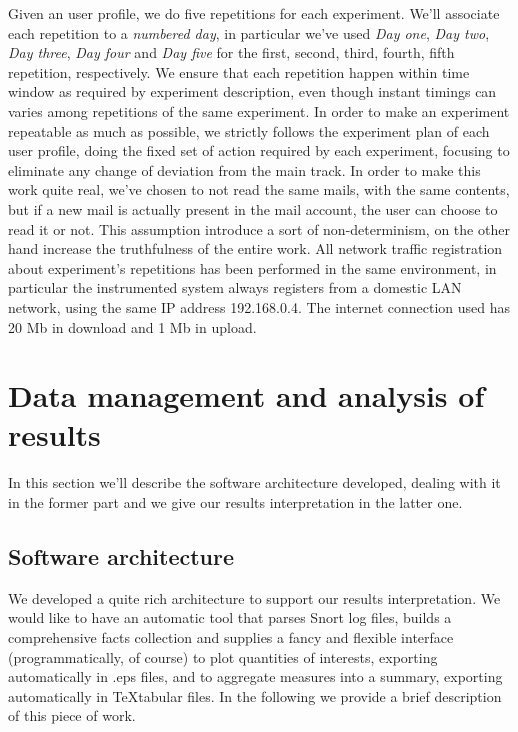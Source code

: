 \documentclass[10pt,a4paper]{article}
\begin{document}
    Given an user profile, we do five repetitions for each
    experiment. We'll associate each repetition to a \emph{numbered
      day}, in particular we've used \emph{Day one}, \emph{Day two},
    \emph{Day three}, \emph{Day four} and \emph{Day five} for the
    first, second, third, fourth, fifth repetition, respectively. We
    ensure that each repetition happen within time window as required
    by experiment description, even though instant timings can varies
    among repetitions of the same experiment. In order to make an
    experiment repeatable as much as possible, we strictly follows the
    experiment plan of each user profile, doing the fixed set of
    action required by each experiment, focusing to eliminate any
    change of deviation from the main track. In order to make this
    work quite real, we've chosen to not read the same mails, with the
    same contents, but if a new mail is actually present in the mail
    account, the user can choose to read it or not. This assumption
    introduce a sort of non-determinism, on the other hand increase
    the truthfulness of the entire work. All network traffic
    registration about experiment's repetitions has been performed in
    the same environment, in particular the instrumented system always
    registers from a domestic LAN network, using the same IP address
    192.168.0.4. The internet connection used has 20 Mb in download
    and 1 Mb in upload.



    \newpage
    \section{Data management and analysis of results}
    \label{sec:data-management-result-analysis}

    In this section we'll describe the software architecture
    developed, dealing with it in the former part and we give our
    results interpretation in the latter one.

    \subsection{Software architecture}
    We developed a quite rich architecture to support our results
    interpretation. We would like to have an automatic tool that
    parses Snort log files, builds a comprehensive facts collection
    and supplies a fancy and flexible interface (programmatically, of
    course) to plot quantities of interests, exporting automatically
    in .eps files, and to aggregate measures into a summary, exporting
    automatically in \TeX tabular files. In the following we provide a
    brief description of this piece of work.
\end{document}
